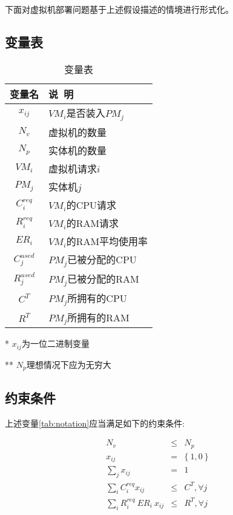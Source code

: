 下面对虚拟机部署问题基于上述假设描述的情境进行形式化。

\subsection*{变量表}
\label{sec:notation-table}

\begin{table}[htbp]

  \centering
  \begin{threeparttable}
    \caption{\label{tab:notation}变量表}
    \begin{tabular}{cl}
      \toprule
        变量名  &  说~明  \\
      \midrule
        $x_{ij}$    &  $VM_i$是否装入$PM_j$    \\
        $N_v$      &  虚拟机的数量    \\
        $N_p$      &  实体机的数量    \\
        $VM_i$     &  虚拟机请求$i$  \\
        $PM_j$     &  实体机$j$     \\
        $C^{req}_i$  &  $VM_i$的CPU请求 \\
        $R^{req}_i$  & $VM_i$的RAM请求 \\
        $ER_i$  & $VM_i$的RAM平均使用率 \\
        $C^{used}_j$  & $PM_j$已被分配的CPU \\
        $R^{used}_j$  & $PM_j$已被分配的RAM \\
        $C^T$       & $PM_j$所拥有的CPU \\
        $R^T$       & $PM_j$所拥有的RAM \\
      \bottomrule
    \end{tabular}
    \tiny
    \begin{tablenotes}
    \item [*] $x_{ij}$为一位二进制变量
    \item [**]$N_p$理想情况下应为无穷大
    \end{tablenotes}

  \end{threeparttable}
\end{table}

\subsection*{约束条件}
\label{sec:constraints}
上述变量\eqref{tab:notation}应当满足如下的约束条件:

\begin{eqnarray}
  \label{eq:constraints}
  N_v &\leq& N_p \label{eq:con:1}\\
  x_{ij} &=& \{\ 1,0\ \} \label{eq:con:2}\\
  \sum_j x_{ij} &=& 1 \label{eq:con:3} \\
  \sum_i C^{req}_i x_{ij} &\leq& C^T , \forall j \label{eq:con:4}\\
  \sum_i R^{req}_i\ ER_i\  x_{ij} &\leq& R^T , \forall j \label{eq:con:5}
\end{eqnarray}

